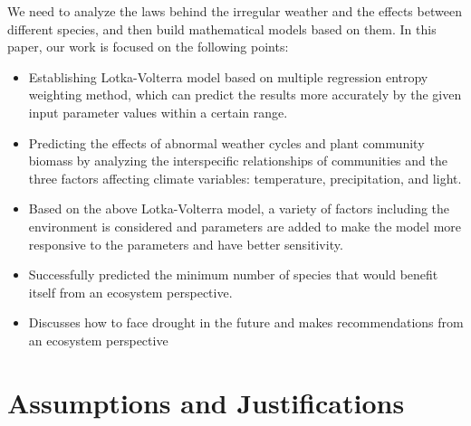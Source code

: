 \documentclass[12pt]{article}
\begin{document}
We need to analyze the laws behind the irregular weather and the effects between different species, and then build mathematical models based on them. In this paper, our work is focused on the following points:

\begin{itemize}
	\item Establishing Lotka-Volterra model based on multiple regression entropy weighting method, which can predict the results more accurately by the given input parameter values within a certain range.
	\item Predicting the effects of abnormal weather cycles and plant community biomass by analyzing the interspecific relationships of communities and the three factors affecting climate variables: temperature, precipitation, and light.
	\item Based on the above Lotka-Volterra model, a variety of factors including the environment is considered and parameters are added to make the model more responsive to the parameters and have better sensitivity.
	\item Successfully predicted the minimum number of species that would benefit itself from an ecosystem perspective.
	\item Discusses how to face drought in the future and makes recommendations from an ecosystem perspective
\end{itemize}

\section{Assumptions and Justifications}
\end{document}
